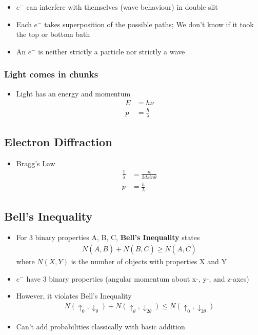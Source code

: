 \documentclass[a4paper,12pt]{article}
\begin{document}
\begin{itemize}
  \item $e^{-}$ can interfere with themselves (wave behaviour) in double slit
  \item Each $e^{-}$ takes superposition of the possible paths; We don't know if it took the top or bottom bath
  \item An $e^{-}$ is neither strictly a particle nor strictly a wave
\end{itemize}


\subsubsection{Light comes in chunks}
\begin{itemize}
  \item Light has an energy and momentum
  \begin{align}
    E &= h\nu \\
    p &= \frac{h}{\lambda}
  \end{align}
\end{itemize}

\subsection{Electron Diffraction}
\begin{itemize}
  \item Bragg's Law
  \begin{align}
    \frac{1}{\lambda} &= \frac{n}{2dsin\theta} \\
    p &= \frac{h}{\lambda}
  \end{align}
\end{itemize}

\subsection{Bell's Inequality}
\begin{itemize}
  \item For 3 binary properties A, B, C, \textbf{Bell's Inequality} states
  \begin{align}
    N(A,\overline{B}) + N(B, \overline{C}) \geq N(A, \overline{C})
  \end{align}
  where $N(X,Y)$ is the number of objects with properties X and Y
  \item $e^{-}$ have 3 binary properties (angular momentum about x-, y-, and z-axes)
  \item However, it violates Bell's Inequality
  \begin{align}
    N(\uparrow_0, \downarrow_{\theta}) + N(\uparrow_{\theta}, \downarrow_{2\theta}) \leq N(\uparrow_0, \downarrow_{2\theta})
  \end{align}
  \item Can't add probabilities classically with basic addition
\end{itemize}
\end{document}
